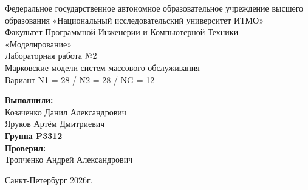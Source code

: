 \begin{titlepage}
    \centering
    Федеральное государственное автономное образовательное учреждение высшего образования «Национальный исследовательский университет ИТМО» \\
    \vspace{1cm}
    Факультет Программной Инженерии и Компьютерной Техники \\
    \vfill
    {\large «Моделирование»} \\
    \vspace{0.5cm}
    Лабораторная работа №2 \\
    Марковские модели систем массового обслуживания \\
    Вариант N1 = 28 / N2 = 28 /  NG = 12
    \vfill
    \vspace{\fill}
    \begin{flushright}
        \textbf{Выполнили:} \\
        Козаченко Данил Александрович\\
        Яруков Артём Дмитриевич\\
        \textbf{Группа P3312} \\
        \textbf{Проверил:} \\
        Тропченко Андрей Александрович
    \end{flushright}
    \vspace{2cm}
    Санкт-Петербург
    2026г.
\end{titlepage}